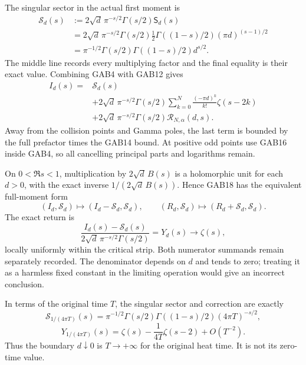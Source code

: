 \documentclass[
  10pt,
  a4paper,
]{article}
\begin{document}
The singular sector in the actual first moment is \[
 \begin{aligned}
 \mathcal S_d(s)
  &:=2\sqrt d\,\pi^{-s/2}\Gamma(s/2)\mathsf S_d(s)\\
  &=2\sqrt d\,\pi^{-s/2}\Gamma(s/2)
          \frac12\Gamma((1-s)/2)(\pi d)^{(s-1)/2}\\
  &=\pi^{-1/2}\Gamma(s/2)\Gamma((1-s)/2)d^{s/2}.
 \end{aligned}                                        \tag{GAB32}
\] The middle line records every multiplying factor and the final
equality is their exact value. Combining GAB4 with GAB12 gives \[
 \begin{aligned}
 I_d(s)={}&\mathcal S_d(s)\\
 &+2\sqrt d\,\pi^{-s/2}\Gamma(s/2)
       \sum_{k=0}^{N}\frac{(-\pi d)^k}{k!}\zeta(s-2k)\\
 &+2\sqrt d\,\pi^{-s/2}\Gamma(s/2)
                  \mathcal R_{N,\alpha}(d,s).
 \end{aligned}                                        \tag{GAB33}
\] Away from the collision points and Gamma poles, the last term is
bounded by the full prefactor times the GAB14 bound. At positive odd
points use GAB16 inside GAB4, so all cancelling principal parts and
logarithms remain.

On \(0<\Re s<1\), multiplication by \(2\sqrt d\,B(s)\) is a holomorphic
unit for each \(d>0\), with the exact inverse \(1/(2\sqrt d\,B(s))\).
Hence GAB18 has the equivalent full-moment form \[
 (I_d,\mathcal S_d)\longmapsto
    (I_d-\mathcal S_d,\mathcal S_d),
 \qquad
 (R_d,\mathcal S_d)\longmapsto(R_d+\mathcal S_d,\mathcal S_d).
                                                        \tag{GAB34}
\] The exact return is \[
 \boxed{\displaystyle
 \frac{I_d(s)-\mathcal S_d(s)}
      {2\sqrt d\,\pi^{-s/2}\Gamma(s/2)}
       =Y_d(s)\longrightarrow\zeta(s),}                \tag{GAB35}
\] locally uniformly within the critical strip. Both numerator summands
remain separately recorded. The denominator depends on \(d\) and tends
to zero; treating it as a harmless fixed constant in the limiting
operation would give an incorrect conclusion.

In terms of the original time \(T\), the singular sector and correction
are exactly \[
 \mathcal S_{1/(4\pi T)}(s)
 =\pi^{-1/2}\Gamma(s/2)\Gamma((1-s)/2)(4\pi T)^{-s/2},
\] \[
 Y_{1/(4\pi T)}(s)
 =\zeta(s)-\frac1{4T}\zeta(s-2)+O(T^{-2}).
                                                        \tag{GAB36}
\] Thus the boundary \(d\downarrow0\) is \(T\to+\infty\) for the
original heat time. It is not its zero-time value.
\end{document}
